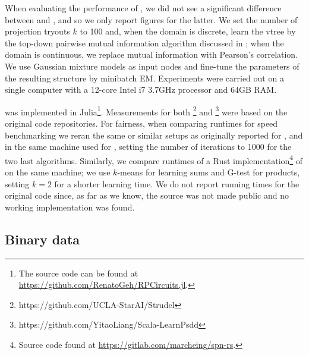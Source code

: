 When evaluating the performance of , we did not see a significant difference
between  and , and so we only report figures for the latter.
We set the number of projection tryouts $k$ to 100 and, when the domain is discrete, learn the
vtree by the top-down pairwise mutual information algorithm discussed in ; when
the domain is continuous, we replace mutual information with Pearson's correlation. We use Gaussian
mixture models as input nodes and fine-tune the parameters of the resulting structure by minibatch
EM. Experiments were carried out on a single computer with a 12-core Intel i7 3.7GHz processor and
64GB RAM.

 was implemented in Julia\footnote{The source code can be found at
\url{https://github.com/RenatoGeh/RPCircuits.jl}.}. Measurements for both
\footnote{https://github.com/UCLA-StarAI/Strudel} and
\footnote{https://github.com/YitaoLiang/Scala-LearnPsdd} were based on the
original code repositories. For fairness, when comparing runtimes for speed benchmarking we reran
the same or similar setups as originally reported for ,  and
 in the same machine used for , setting the number of
iterations to 1000 for the two last \incrclass{} algorithms. Similarly, we compare runtimes of a
Rust implementation\footnote{Source code found at \url{https://gitlab.com/marcheing/spn-rs}.} of
 on the same machine; we use $k$-means for learning sums and G-test for
products, setting $k=2$ for a shorter learning time. We do not report running times for the
original  code since, as far as we know, the source was not made public and no
working implementation was found.

\subsection{Binary data}

